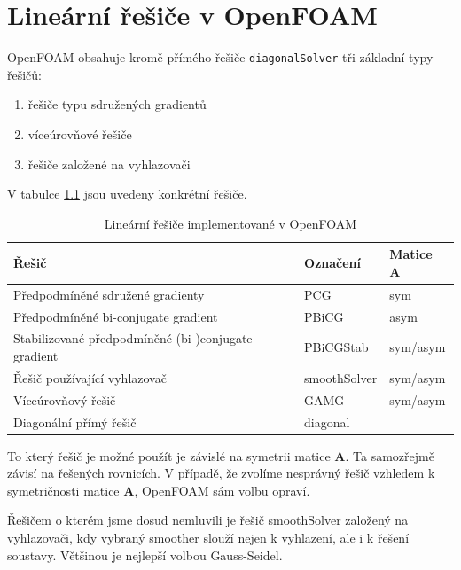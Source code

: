 \documentclass[a4paper,12pt]{report}
\theoremstyle{remark}
\begin{document}
	{\let\clearpage\relax \chapter{Lineární řešiče v OpenFOAM}}

OpenFOAM obsahuje kromě přímého řešiče \texttt{diagonalSolver} tři základní typy řešičů:
\begin{enumerate}
	\item řešiče typu sdružených gradientů 
	\item víceúrovňové řešiče
	\item řešiče založené na vyhlazovači

\end{enumerate}

V tabulce \ref{table:solvers} jsou uvedeny konkrétní řešiče.

\begin{table}[H]
	\centering
	\caption{Lineární řešiče implementované v OpenFOAM}
	\renewcommand{\arraystretch}{1.7}
	\begin{tabular}{*3l}
		\toprule
		\textbf{Řešič} & \textbf{Označení}&\textbf{Matice $\boldsymbol{A}$}\\
		\midrule
		{\small Předpodmíněné sdružené gradienty}& PCG& sym\\
		{\small Předpodmíněné bi-conjugate gradient}& PBiCG&asym \\		
		{\small Stabilizované předpodmíněné (bi-)conjugate gradient}& PBiCGStab&sym/asym  \\
		{\small Řešič používající vyhlazovač}& smoothSolver&sym/asym \\
		{\small Víceúrovňový řešič}& GAMG&sym/asym  \\
		{\small Diagonální přímý řešič}& 	diagonal \\
	
		\bottomrule
	\end{tabular}
	
	\label{table:solvers}
\end{table}
		
	To který řešič je možné použít je závislé na symetrii matice $\boldsymbol{A}$. Ta samozřejmě závisí na řešených rovnicích. V případě, že zvolíme nesprávný řešič vzhledem k symetričnosti matice $\boldsymbol{A}$, OpenFOAM sám volbu opraví.
	
	Řešičem o kterém jsme dosud nemluvili je řešič smoothSolver založený na vyhlazovači, kdy vybraný smoother slouží nejen k vyhlazení, ale i k řešení soustavy.  Většinou je nejlepší volbou Gauss-Seidel.
	
\end{document}

